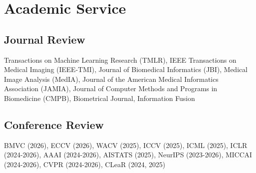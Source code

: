 \section{Academic Service}
\subsection{Journal Review}
Transactions on Machine Learning Research (TMLR), IEEE Transactions on Medical Imaging (IEEE-TMI), Journal of Biomedical Informatics (JBI), Medical Image Analysis (MedIA), Journal of the American Medical Informatics Association (JAMIA), Journal of Computer Methods and Programs in Biomedicine (CMPB), Biometrical Journal, Information Fusion

\subsection{Conference Review}
BMVC (2026), ECCV (2026), WACV (2025), ICCV (2025), ICML (2025), ICLR (2024-2026), AAAI (2024-2026), AISTATS (2025), NeurIPS (2023-2026), MICCAI (2024-2026), CVPR (2024-2026), CLeaR (2024, 2025)


